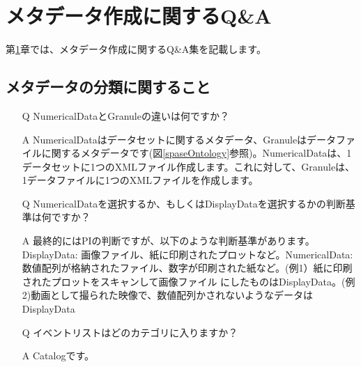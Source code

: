 \chapter{メタデータ作成に関するQ\&A}\label{qa}
第\ref{qa}章では、メタデータ作成に関するQ\&A集を記載します。

\section{メタデータの分類に関すること}

\setcounter{qq}{0}
\setcounter{aa}{0}

\begin{screen}
\begin{itemize}
\item[\stepcounter{qq}Q\theqq] NumericalDataとGranuleの違いは何ですか？
\item[\stepcounter{aa}A\theaa] NumericalDataはデータセットに関するメタデータ、Granuleはデータファイルに関するメタデータです(図\ref{spaseOntology}参照)。NumericalDataは、1データセットに1つのXMLファイル作成します。これに対して、Granuleは、1データファイルに1つのXMLファイルを作成します。
\end{itemize}
\end{screen}

\begin{screen}
\begin{itemize}
\item[\stepcounter{qq}Q\theqq] NumericalDataを選択するか、もしくはDisplayDataを選択するかの判断基準は何ですか？
\item[\stepcounter{aa}A\theaa] 最終的にはPIの判断ですが、以下のような判断基準があります。DisplayData: 画像ファイル、紙に印刷されたプロットなど。NumericalData: 数値配列が格納されたファイル、数字が印刷された紙など。(例1）紙に印刷されたプロットをスキャンして画像ファイル
にしたものはDisplayData。(例2)動画として撮られた映像で、数値配列かされないようなデータはDisplayData
\end{itemize}
\end{screen}

\begin{screen}
\begin{itemize}
\item[\stepcounter{qq}Q\theqq] イベントリストはどのカテゴリに入りますか？
\item[\stepcounter{aa}A\theaa] Catalogです。
\end{itemize}
\end{screen}

